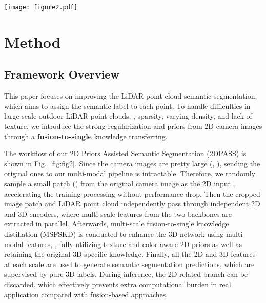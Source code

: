 \documentclass[runningheads]{llncs}
\begin{document}
	
	
		\begin{figure*}[t]
		\begin{centering}
			\texttt{[image: figure2.pdf]}
			\caption{\textbf{{2D Priors Assisted Semantic Segmentation} ({2DPASS}).} It first crops a small patch from the original camera image as the 2D input.
Then the cropped image patch and LiDAR point cloud independently pass through the 2D and 3D encoders to generate multi-scale features in parallel.
Afterwards, for each scale, complementary 2D knowledge is effectively transferred to the 3D network via the multi-scale fusion-to-single knowledge distillation (MSFSKD).
The feature maps (in the form of either pixel grid or point set) are used to generate the final semantic scores using modal-specific decoders, which are supervised by pure 3D labels.
}
			\label{fig:fig2}
		\end{centering}	
	\end{figure*}
	
	
	\section{Method}
	\subsection{Framework Overview}
This paper focuses on improving the LiDAR point cloud semantic segmentation, which aims to assign the semantic label to each point.
To handle difficulties in large-scale outdoor LiDAR point clouds, \ie, sparsity, varying density, and lack of texture, we introduce the strong regularization and priors from 2D camera images through a \textbf{fusion-to-single} knowledge transferring.
	
	
	The workflow of our {2D Priors Assisted Semantic Segmentation} ({2DPASS}) is shown in Fig.~\ref{fig:fig2}.
Since the camera images are pretty large (\eg, ), sending the original ones to our multi-modal pipeline is intractable.
Therefore, we randomly sample a small patch () from the original camera image as the 2D input \cite{jaritz2020xmuda}, accelerating the training processing without performance drop.
Then the cropped image patch and LiDAR point cloud independently pass through independent 2D and 3D encoders, where multi-scale features from the two backbones are extracted in parallel.
Afterwards, multi-scale fusion-to-single knowledge distillation (MSFSKD) is conducted to enhance the 3D network using multi-modal features, \ie, fully utilizing texture and color-aware 2D priors as well as retaining the original 3D-specific knowledge.
Finally, all the 2D and 3D features at each scale are used to generate semantic segmentation predictions, which are supervised by pure 3D labels.
During inference, the 2D-related branch can be discarded, which effectively prevents extra computational burden in real application compared with fusion-based approaches.
	
\end{document}
